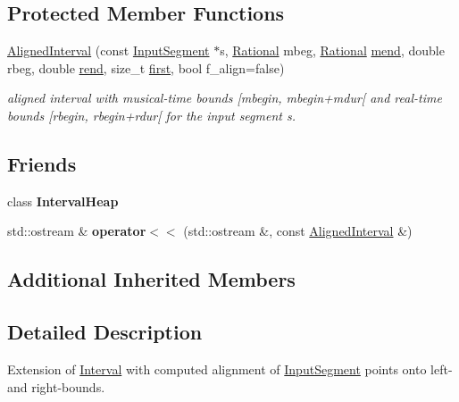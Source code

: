\subsection*{Protected Member Functions}
\begin{DoxyCompactItemize}
\item 
\mbox{\hyperlink{group__segment_ga4aa5548293e2dcd94ab3845d9a8fe492}{Aligned\+Interval}} (const \mbox{\hyperlink{classInputSegment}{Input\+Segment}} $\ast$s, \mbox{\hyperlink{classRational}{Rational}} mbeg, \mbox{\hyperlink{classRational}{Rational}} \mbox{\hyperlink{classInterval_a963b9b36f085a7db9c159c55608f8408}{mend}}, double rbeg, double \mbox{\hyperlink{classInterval_a1acb3128311a318b23e68cc8ca0182e9}{rend}}, size\+\_\+t \mbox{\hyperlink{classAlignedInterval_a1660736ae6e829e6c92616e49784a583}{first}}, bool f\+\_\+align=false)
\begin{DoxyCompactList}\small\item\em aligned interval with musical-\/time bounds \mbox{[}mbegin, mbegin+mdur\mbox{[} and real-\/time bounds \mbox{[}rbegin, rbegin+rdur\mbox{[} for the input segment s. \end{DoxyCompactList}\end{DoxyCompactItemize}
\subsection*{Friends}
\begin{DoxyCompactItemize}
\item 
\mbox{\label{classAlignedInterval_ac157527bf2349e36ef2475096d268e4e}} 
class {\bfseries Interval\+Heap}
\item 
\mbox{\label{classAlignedInterval_a08c62a5a4c60368e97b1385aced32756}} 
std\+::ostream \& {\bfseries operator$<$$<$} (std\+::ostream \&, const \mbox{\hyperlink{classAlignedInterval}{Aligned\+Interval}} \&)
\end{DoxyCompactItemize}
\subsection*{Additional Inherited Members}


\subsection{Detailed Description}
Extension of \mbox{\hyperlink{classInterval}{Interval}} with computed alignment of \mbox{\hyperlink{classInputSegment}{Input\+Segment}} points onto left-\/ and right-\/bounds. 

